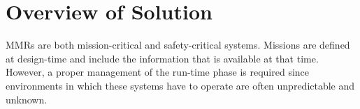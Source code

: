 \documentclass[journal]{IEEEtran}
\theoremstyle{definition}
\newcommand{\ra}{$\rightarrow$}
\newcommand{\chg}[2]{\textcolor{red}{\sout{#1}}{\ra}\textcolor{blue}{\uline{#2}}} %
\begin{document}











\section{Overview of Solution}



MMRs are both mission-critical and safety-critical systems. Missions are defined at
design-time and include the information that is available at that time. However, a proper management of the run-time phase is required since environments in which these systems have to
operate are often unpredictable and unknown. 
\end{document}
